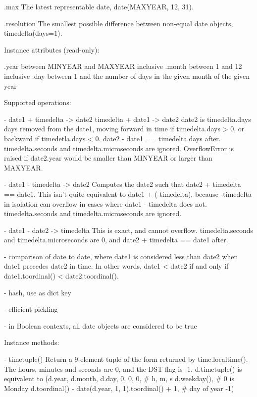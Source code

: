 {    .max
        The latest representable date, date(MAXYEAR, 12, 31).

    .resolution
        The smallest possible difference between non-equal date
        objects, timedelta(days=1).

Instance attributes (read-only):

    .year           between MINYEAR and MAXYEAR inclusive
    .month          between 1 and 12 inclusive
    .day            between 1 and the number of days in the given month
                    of the given year

Supported operations:

    - date1 + timedelta -> date2
      timedelta + date1 -> date2
      date2 is timedelta.days days removed from the date1, moving forward
      in time if timedelta.days > 0, or backward if timedetla.days < 0.
      date2 - date1 == timedelta.days after.  timedelta.seconds and
      timedelta.microseconds are ignored.  OverflowError is raised if
      date2.year would be smaller than MINYEAR or larger than MAXYEAR.

    - date1 - timedelta -> date2
      Computes the date2 such that date2 + timedelta == date1.  This
      isn't quite equivalent to date1 + (-timedelta), because -timedelta
      in isolation can overflow in cases where date1 - timedelta does
      not.  timedelta.seconds and timedelta.microseconds are ignored.

    - date1 - date2 -> timedelta
      This is exact, and cannot overflow.  timedelta.seconds and
      timedelta.microseconds are 0, and date2 + timedelta == date1
      after.

    - comparison of date to date, where date1 is considered less than
      date2 when date1 precedes date2 in time.  In other words,
      date1 < date2 if and only if date1.toordinal() < date2.toordinal().

    - hash, use as dict key

    - efficient pickling

    - in Boolean contexts, all date objects are considered to be true

Instance methods:

  - timetuple()
    Return a 9-element tuple of the form returned by time.localtime().
    The hours, minutes and seconds are 0, and the DST flag is -1.
    d.timetuple() is equivalent to
        (d.year, d.month, d.day,
         0, 0, 0,  # h, m, s
         d.weekday(),  # 0 is Monday
         d.toordinal() - date(d.year, 1, 1).toordinal() + 1, # day of year
         -1)

}
